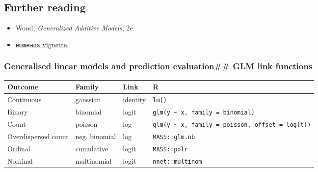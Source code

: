 \documentclass[
]{article}
\newcounter{none} %
\providecommand{\tightlist}{%
  \setlength{\itemsep}{0pt}\setlength{\parskip}{0pt}}
\begin{document}
\subsection{Further reading}\label{further-reading-5}

\begin{itemize}
\tightlist
\item
  Wood, \emph{Generalized Additive Models}, 2e.
\item
  \href{https://cran.r-project.org/package=emmeans}{\texttt{emmeans}
  vignette}.
\end{itemize}

\subsubsection{Generalised linear models and prediction evaluation\#\#
GLM link
functions}\label{generalised-linear-models-and-prediction-evaluation-glm-link-functions}

{\def\LTcaptype{none} %
\begin{longtable}[]{@{}
  >{\raggedright\arraybackslash}p{}
  >{\raggedright\arraybackslash}p{}
  >{\raggedright\arraybackslash}p{}
  >{\raggedright\arraybackslash}p{}@{}}
\toprule\noalign{}
\begin{minipage}[b]{\linewidth}\raggedright
Outcome
\end{minipage} & \begin{minipage}[b]{\linewidth}\raggedright
Family
\end{minipage} & \begin{minipage}[b]{\linewidth}\raggedright
Link
\end{minipage} & \begin{minipage}[b]{\linewidth}\raggedright
R
\end{minipage} \\
\midrule\noalign{}
\endhead
\bottomrule\noalign{}
\endlastfoot
Continuous & gaussian & identity & \texttt{lm()} \\
Binary & binomial & logit &
\texttt{glm(y\ \textasciitilde{}\ x,\ family\ =\ binomial)} \\
Count & poisson & log &
\texttt{glm(y\ \textasciitilde{}\ x,\ family\ =\ poisson,\ offset\ =\ log(t))} \\
Overdispersed count & neg. binomial & log & \texttt{MASS::glm.nb} \\
Ordinal & cumulative & logit & \texttt{MASS::polr} \\
Nominal & multinomial & logit & \texttt{nnet::multinom} \\
\end{longtable}
}
\end{document}
